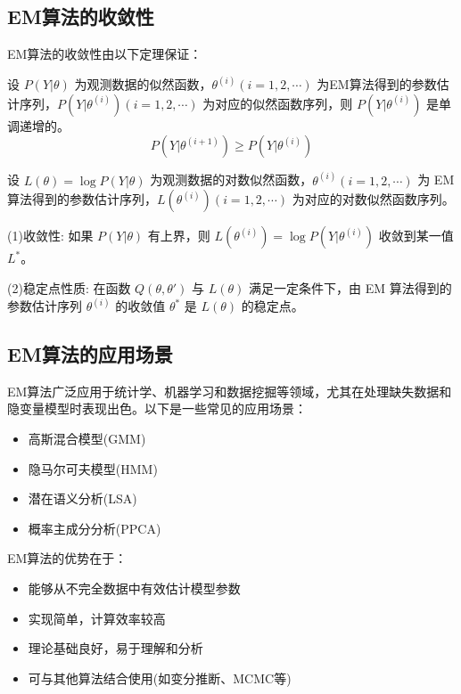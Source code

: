 \documentclass[a4paper,12pt]{ctexart} %
\begin{document}
\subsection{EM算法的收敛性}
EM算法的收敛性由以下定理保证：

\begin{theorem}[单调性]
设 $P(Y|\theta)$ 为观测数据的似然函数，$\theta^{(i)}(i=1,2,\cdots)$ 为EM算法得到的参数估计序列，$P(Y|\theta^{(i)})(i=1,2,\cdots)$ 为对应的似然函数序列，则 $P(Y|\theta^{(i)})$ 是单调递增的。
\begin{equation}
P(Y|\theta^{(i+1)}) \geq P(Y|\theta^{(i)})
\end{equation}
\end{theorem}

\begin{theorem}[收敛性]
设 $L(\theta) = \log P(Y|\theta)$ 为观测数据的对数似然函数，$\theta^{(i)} (i = 1, 2, \cdots)$ 为 EM 算法得到的参数估计序列，$L(\theta^{(i)}) (i = 1, 2, \cdots)$ 为对应的对数似然函数序列。  

(1)收敛性:
如果 $P(Y|\theta)$ 有上界，则 $L(\theta^{(i)}) = \log P(Y|\theta^{(i)})$ 收敛到某一值 $L^*$。  

(2)稳定点性质:
在函数 $Q(\theta, \theta')$ 与 $L(\theta)$ 满足一定条件下，由 EM 算法得到的参数估计序列 $\theta^{(i)}$ 的收敛值 $\theta^*$ 是 $L(\theta)$ 的稳定点。
\end{theorem}

\subsection{EM算法的应用场景}

EM算法广泛应用于统计学、机器学习和数据挖掘等领域，尤其在处理缺失数据和隐变量模型时表现出色。以下是一些常见的应用场景：
\begin{itemize}
    \item 高斯混合模型(GMM)
    \item 隐马尔可夫模型(HMM)
    \item 潜在语义分析(LSA)
    \item 概率主成分分析(PPCA)
\end{itemize}
            
EM算法的优势在于：
\begin{itemize}
    \item 能够从不完全数据中有效估计模型参数
    \item 实现简单，计算效率较高
    \item 理论基础良好，易于理解和分析
    \item 可与其他算法结合使用(如变分推断、MCMC等)
\end{itemize}
\end{document}
